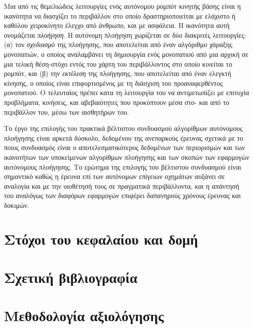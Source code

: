 Μια από τις θεμελιώδεις λειτουργίες ενός αυτόνομου ρομπότ κινητής βάσης είναι η
ικανότητα να διασχίζει το περιβάλλον στο οποίο δραστηριοποιείται με ελάχιστο ή
καθόλου χειροκίνητο έλεγχο από άνθρωπο, και με ασφάλεια. Η ικανότητα αυτή
ονομάζεται \textit{πλοήγηση}. Η αυτόνομη πλοήγηση χωρίζεται σε δύο διακριτές
λειτουργίες: (α) τον \textit{σχεδιασμό} της πλοήγησης, που αποτελείται από έναν
αλγόριθμο χάραξης μονοπατιών, ο οποίος αναλαμβάνει τη δημιουργία ενός
μονοπατιού από μια αρχική σε μια τελική θέση-στόχο εντός του χάρτη του
περιβάλλοντος στο οποίο κινείται το ρομπότ, και (β) την \textit{εκτέλεση} της
πλοήγησης, που αποτελείται από έναν ελεγκτή κίνησης, ο οποίος είναι
επιφορτισμένος με τη διάσχιση του προαναφερθέντος μονοπατιού. Ο τελευταίος
πρέπει κατα τη λειτουργία του να αντιμετωπίζει με επιτυχία προβλήματα,
κινήσεις, και αβεβαιότητες που προκύπτουν μέσα στο- και από το περιβάλλον του,
μέσω των αισθητήρων του.

Το έργο της επιλογής του πρακτικά βέλτιστου συνδυασμού αλγορίθμων αυτόνομους
πλοήγησης είναι αρκετά δύσκολο, δεδομένου της ανεπαρκούς έρευνας σχετικά με το
ποιος συνδυασμός είναι ο αποτελεσματικότερος δεδομένων των περιορισμών και των
ικανοτήτων των υποκείμενων αλγορίθμων πλοήγησης και των σκοπών των εφαρμογών
αυτόνομους πλοήγησης. Το ερώτημα της επιλογής του βέλτιστου συνδυασμού είναι
σημαντικό καθώς η έρευνα επί των αυτόνομων επίγειων οχημάτων αυξάνει σε
αναλογία και με την υιοθέτησή τους σε πραγματικά περιβάλλοντα, και η απάντησή
του αναλόγως των διαφόρων εφαρμογών επιφέρει δαπανηρούς χρόνους έρευνας και
δοκιμών.

\section{Στόχοι του κεφαλαίου και δομή}
  \label{section:02_01_01}
  

\section{Σχετική βιβλιογραφία}
  \label{section:02_01_02}
  

\section{Μεθοδολογία αξιολόγησης}
  \label{section:02_01_03}
  

